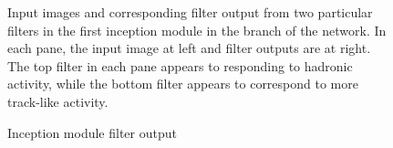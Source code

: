 \begin{figure}
\begin{center}
\begin{subfigure}[b]{\textwidth}
  \end{subfigure}%
  \vspace{-15pt}
\end{center}
  \caption{Inception module filter output}
  {
    Input images and corresponding filter output from two particular
    filters in the first inception module in the \yview branch of the
    network.
    In each pane, the input image at left and filter outputs are at right.
    The top filter in each pane appears to responding to hadronic activity,
    while the bottom filter appears to correspond to more track-like activity.

  }
  \label{inceptionexamples}
\end{figure}


